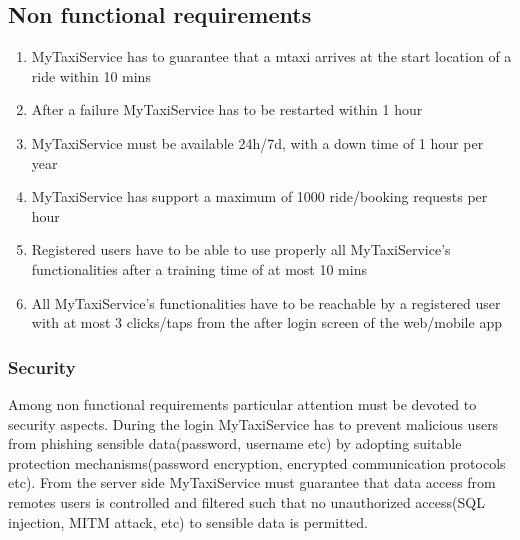 \documentclass[11pt,titlepage]{article} %
\begin{document}
    \subsection{Non functional requirements}
	\begin{enumerate}
	      \item MyTaxiService has to guarantee that a mtaxi arrives at the start location of a ride within 10 mins
	      \item After a failure MyTaxiService has to be restarted within 1 hour
	      \item MyTaxiService must be available 24h/7d, with a down time of 1 hour per year
	      \item MyTaxiService has support a maximum of 1000 ride/booking requests per hour
	      \item Registered users have to be able to use properly all MyTaxiService's functionalities after a training time of at most 10 mins
	      \item All MyTaxiService's functionalities have to be reachable by a registered user with at most 3 clicks/taps from the after login screen
	      of the web/mobile app
	\end{enumerate}

      \subsubsection{Security}
        Among non functional requirements particular attention must be devoted to security aspects.
        During the login MyTaxiService has to prevent malicious users from phishing sensible data(password, username etc) by adopting suitable
        protection mechanisms(password encryption, encrypted communication protocols etc).
        From the server side MyTaxiService must guarantee that data access from remotes users is controlled and filtered such that
        no unauthorized access(SQL injection, MITM attack, etc) to sensible data is permitted.
\newpage
\end{document}
